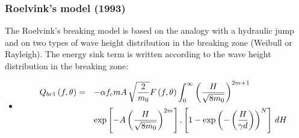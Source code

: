 \subsubsection{Roelvink's model (1993)}
\label{parag4.3.5.3}
The Roelvink's breaking model \cite{Roelvink1993} is based on the analogy
with a hydraulic jump and on two types of wave height distribution in the
breaking zone (Weibull or Rayleigh). The energy sink term is written according
to the wave height distribution in the breaking zone:

\begin{itemize}
\item  {}
\begin{equation} \label{GrindEQ__4_50_}
\barr{ll}
\dsp Q_{br1} \left(f,\theta \right)=&\dsp -\alpha f_c mA\, \sqrt{\frac{2}{m_0 }}
F\left(f,\theta \right)\int _0^{\infty }\left(\frac{H}{\sqrt{8m_0} } \right)^{2m+1}
\\[12pt]
&\dsp \exp \left[-A\left(\frac{H}{\sqrt{8m_{0} } } \right)^{2m} \right].
\left[1-\exp \left(-\left(\frac{H}{\gamma d} \right)\right)^{N} \right] \, dH
\earr
\end{equation}
\end{itemize}

